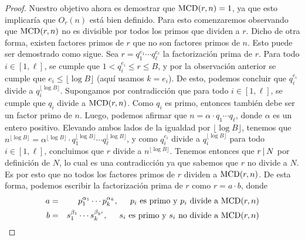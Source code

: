 \documentclass[10pt]{article}
\newcommand{\0}{\mathbf{0}}
\newcommand{\1}{\mathbf{1}}
\newcommand{\divi}{\hspace{1.8pt}|\hspace{1.8pt}}
\newcommand{\MCD}{{\rm MCD}}
\newcommand{\+}{\oplus}
\theoremstyle{remark}
\theoremstyle{remark}
\begin{document}
\begin{proof}
Nuestro objetivo ahora es demostrar que $\MCD(r,n) =1 $, ya que esto implicaría que $O_r(n)$ está bien definido. 
Para esto comenzaremos observando que $\MCD(r,n)$ no es divisible por todos los primos que dividen a $r$. Dicho de otra forma, existen factores primos de $r$ que no son factores primos de $n$. Esto puede ser demostrado como sigue. Sea $r=q_1^{e_1}\cdots q_{\ell}^{e_{\ell}}$ la factorización prima de $r$.
Para todo $i\in [1, \ell]$, se cumple que $1<q_i^{e_i}\leq r\leq B$, y por la observación anterior se cumple que $e_i\leq \lfloor\log B\rfloor$ (aquí usamos $k=e_i$). De esto, podemos concluir que $q_i^{e_i}$ divide a $q_i^{\lfloor\log B\rfloor}$.
 Supongamos por contradicción que para todo $i\in [1, \ell]$, se cumple que $q_i$ divide a $\MCD(r,n)$. Como $q_i$ es primo, entonces también debe ser un factor primo de $n$. Luego, podemos afirmar que $n=\alpha\cdot q_1\cdots q_{\ell}$, donde $\alpha$ es un entero positivo. Elevando ambos lados de la igualdad por $\lfloor\log B\rfloor$, tenemos que $n^{\lfloor\log B\rfloor}=\alpha^{\lfloor\log B\rfloor}\cdot q_1^{\lfloor\log B\rfloor}\cdots q_{\ell}^{\lfloor\log B\rfloor}$, y como $q_i^{e_i}$ divide a $q_i^{\lfloor\log B\rfloor}$ para todo $i\in [1, \ell]$, concluimos que $r$ divide a $n^{\lfloor\log B\rfloor}$. Tenemos entonces que $r \divi N$ por definición de $N$, 
 lo cual es una contradicción ya que sabemos que $r$ no divide a $N$. Es por esto que no todos los factores primos de $r$ dividen a $\MCD(r,n)$. De esta forma, podemos escribir la factorización prima de $r$ como $r = a\cdot b$, donde
 \begin{eqnarray*}
 	a&=& p_1^{\alpha_1}\cdots p_k^{\alpha_k},\hspace{0.5cm}p_i\text{ es primo y $p_i$ divide a }\MCD(r,n)\\
 	b&=& s_1^{\beta_1}\cdots s_k^{\beta_{k'}},\hspace{0.5cm}s_i\text{ es primo y $s_i$ no divide a }\MCD(r,n)
 \end{eqnarray*}

\end{proof}
\end{document}
